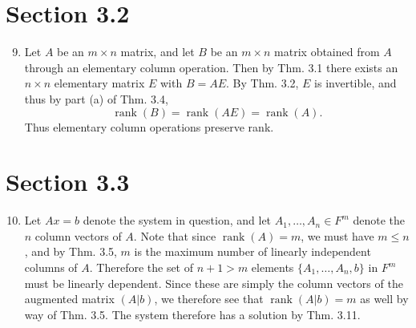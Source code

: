 \documentclass[12pt]{article}
\DeclareMathOperator{\rank}{rank}
\begin{document}
\section*{Section 3.2}

\begin{enumerate}
\setcounter{enumi}{8}
\item
Let $A$ be an $m \times n$ matrix, and let $B$ be an $m \times n$ matrix obtained from $A$ through an elementary column operation. Then by Thm. 3.1 there exists an $n \times n$ elementary matrix $E$ with $B = AE$. By Thm. 3.2, $E$ is invertible, and thus by part (a) of Thm. 3.4,
\begin{equation*}
\rank(B) = \rank(AE) = \rank(A).
\end{equation*}
Thus elementary column operations preserve rank.

\end{enumerate}

\section*{Section 3.3}

\begin{enumerate}
\setcounter{enumi}{9}
\item
Let $Ax=b$ denote the system in question, and let $A_1, \dots, A_n \in F^m$ denote the $n$ column vectors of $A$. Note that since $\rank(A) = m$, we must have $m \leq n$, and by Thm. 3.5, $m$ is the maximum number of linearly independent columns of $A$. Therefore the set of $n + 1 > m$ elements $\{A_1, \dots, A_n, b\}$ in $F^m$ must be linearly dependent. Since these are simply the column vectors of the augmented matrix $(A|b)$, we therefore see that $\rank(A|b) = m$ as well by way of Thm. 3.5. The system therefore has a solution by Thm. 3.11.

\end{enumerate}
\end{document}
